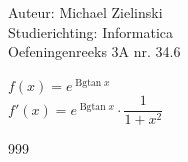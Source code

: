 \documentclass[a4paper]{article}
\begin{document}
\noindent \large Auteur: Michael Zielinski \\
\noindent \large Studierichting: Informatica\\
\noindent \large Oefeningenreeks 3A nr. 34.6\\

\medskip

\normalsize

$f(x) = e^{\operatorname{Bgtan} x}$\\

$f'(x) = e^{\operatorname{Bgtan} x} \cdot \dfrac{1}{1+x^2}$\\

\begin{thebibliography}{999}
\end{thebibliography}
\end{document}
